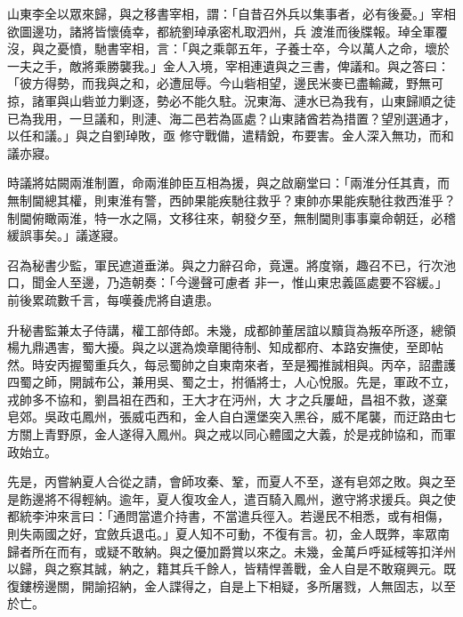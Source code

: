 \begin{pinyinscope}
 山東李全以眾來歸，與之移書宰相，謂：「自昔召外兵以集事者，必有後憂。」宰相欲圖邊功，諸將皆懷僥幸，都統劉琸承密札取泗州，兵
 渡淮而後牒報。琸全軍覆沒，與之憂憤，馳書宰相，言：「與之乘鄣五年，子養士卒，今以萬人之命，壞於一夫之手，敵將乘勝襲我。」金人入境，宰相連遺與之三書，俾議和。與之答曰：「彼方得勢，而我與之和，必遭屈辱。今山砦相望，邊民米麥已盡輸藏，野無可掠，諸軍與山砦並力剿逐，勢必不能久駐。況東海、漣水已為我有，山東歸順之徒已為我用，一旦議和，則漣、海二邑若為區處？山東諸酋若為措置？望別選通才，以任和議。」與之自劉琸敗，亟
 修守戰備，遣精銳，布要害。金人深入無功，而和議亦寢。



 時議將姑闕兩淮制置，命兩淮帥臣互相為援，與之啟廟堂曰：「兩淮分任其責，而無制閫總其權，則東淮有警，西帥果能疾馳往救乎？東帥亦果能疾馳往救西淮乎？制閫俯瞰兩淮，特一水之隔，文移往來，朝發夕至，無制閫則事事稟命朝廷，必稽緩誤事矣。」議遂寢。



 召為秘書少監，軍民遮道垂涕。與之力辭召命，竟還。將度嶺，趣召不已，行次池口，聞金人至邊，乃造朝奏：「今邊聲可慮者
 非一，惟山東忠義區處要不容緩。」前後累疏數千言，每嘆養虎將自遺患。



 升秘書監兼太子侍講，權工部侍郎。未幾，成都帥董居誼以黷貨為叛卒所逐，總領楊九鼎遇害，蜀大擾。與之以選為煥章閣待制、知成都府、本路安撫使，至即帖然。時安丙握蜀重兵久，每忌蜀帥之自東南來者，至是獨推誠相與。丙卒，詔盡護四蜀之師，開誠布公，兼用吳、蜀之士，拊循將士，人心悅服。先是，軍政不立，戎帥多不協和，劉昌祖在西和，王大才在沔州，大
 才之兵屢衄，昌祖不救，遂棄皂郊。吳政屯鳳州，張威屯西和，金人自白還堡突入黑谷，威不尾襲，而迂路由七方關上青野原，金人遂得入鳳州。與之戒以同心體國之大義，於是戎帥協和，而軍政始立。



 先是，丙嘗納夏人合從之請，會師攻秦、鞏，而夏人不至，遂有皂郊之敗。與之至是飭邊將不得輕納。逾年，夏人復攻金人，遣百騎入鳳州，邀守將求援兵。與之使都統李沖來言曰：「通問當遣介持書，不當遣兵徑入。若邊民不相悉，或有相傷，
 則失兩國之好，宜斂兵退屯。」夏人知不可動，不復有言。初，金人既弊，率眾南歸者所在而有，或疑不敢納。與之優加爵賞以來之。未幾，金萬戶呼延棫等扣洋州以歸，與之察其誠，納之，籍其兵千餘人，皆精悍善戰，金人自是不敢窺興元。既復鏤榜邊關，開諭招納，金人諜得之，自是上下相疑，多所屠戮，人無固志，以至於亡。




\end{pinyinscope}

